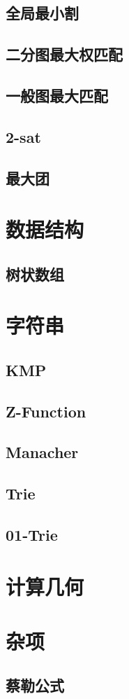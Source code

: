 \documentclass{article}
\begin{document}
\subsection{全局最小割}

\subsection{二分图最大权匹配}

\subsection{一般图最大匹配}
\subsection{2-sat}
\subsection{最大团}


\section{数据结构}
\subsection{树状数组}

\section{字符串}
\subsection{KMP}

\subsection{Z-Function}
\subsection{Manacher}

\subsection{Trie}

\subsection{01-Trie}


\section{计算几何}

\section{杂项}
\subsection{蔡勒公式}
\end{document}
